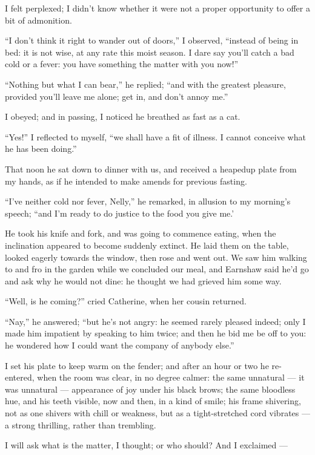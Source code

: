 \par I felt perplexed; I didn't know whether it were not a proper opportunity to offer a bit of admonition.
\par “I don't think it right to wander out of doors,” I observed, “instead of being in bed: it is not wise, at any rate this moist season. I dare say you'll catch a bad cold or a fever: you have something the matter with you now!”
\par “Nothing but what I can bear,” he replied; “and with the greatest pleasure, provided you'll leave me alone; get in, and don't annoy me.”
\par I obeyed; and in passing, I noticed he breathed as fast as a cat.
\par “Yes!” I reflected to myself, “we shall have a fit of illness. I cannot conceive what he has been doing.”
\par That noon he sat down to dinner with us, and received a heapedup plate from my hands, as if he intended to make amends for previous fasting.
\par “I've neither cold nor fever, Nelly,” he remarked, in allusion to my morning's speech; “and I'm ready to do justice to the food you give me.’
\par He took his knife and fork, and was going to commence eating, when the inclination appeared to become suddenly extinct. He laid them on the table, looked eagerly towards the window, then rose and went out. We saw him walking to and fro in the garden while we concluded our meal, and Earnshaw said he'd go and ask why he would not dine: he thought we had grieved him some way.
\par “Well, is he coming?” cried Catherine, when her cousin returned.
\par “Nay,” he answered; “but he's not angry: he seemed rarely pleased indeed; only I made him impatient by speaking to him twice; and then he bid me be off to you: he wondered how I could want the company of anybody else.”
\par I set his plate to keep warm on the fender; and after an hour or two he re-entered, when the room was clear, in no degree calmer: the same unnatural — it was unnatural — appearance of joy under his black brows; the same bloodless hue, and his teeth visible, now and then, in a kind of smile; his frame shivering, not as one shivers with chill or weakness, but as a tight-stretched cord vibrates — a strong thrilling, rather than trembling.
\par I will ask what is the matter, I thought; or who should? And I exclaimed —
